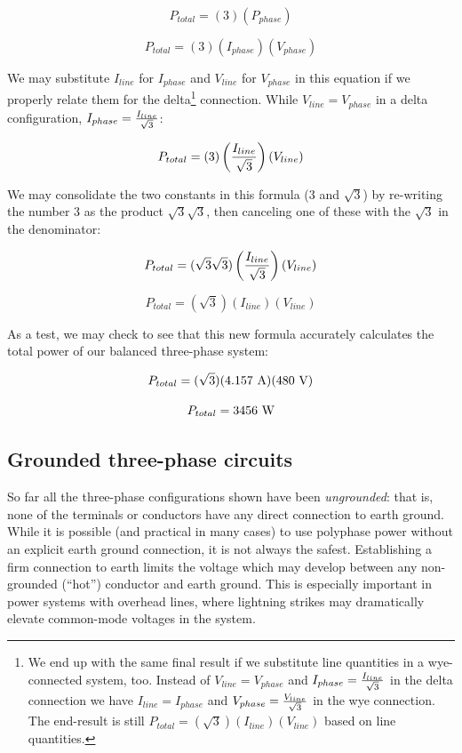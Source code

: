 $$P_{total} = (3) (P_{phase})$$

$$P_{total} = (3) (I_{phase})(V_{phase})$$

\filbreak

We may substitute $I_{line}$ for $I_{phase}$ and $V_{line}$ for $V_{phase}$ in this equation if we properly relate them for the delta\footnote{We end up with the same final result if we substitute line quantities in a wye-connected system, too.  Instead of $V_{line} = V_{phase}$ and $I_{phase} = {I_{line} \over \sqrt{3}}$ in the delta connection we have $I_{line} = I_{phase}$ and $V_{phase} = {V_{line} \over \sqrt{3}}$ in the wye connection.  The end-result is still $P_{total} = (\sqrt{3}) (I_{line})(V_{line})$ based on line quantities.} connection.  While $V_{line} = V_{phase}$ in a delta configuration, $I_{phase} = {I_{line} \over \sqrt{3}}$:

$$P_{total} = (3) \left({I_{line} \over \sqrt{3}}\right)(V_{line})$$

We may consolidate the two constants in this formula (3 and $\sqrt{3}$) by re-writing the number 3 as the product $\sqrt{3} \sqrt{3}$, then canceling one of these with the $\sqrt{3}$ in the denominator:

$$P_{total} = (\sqrt{3} \sqrt{3}) \left({I_{line} \over \sqrt{3}}\right)(V_{line})$$

$$P_{total} = (\sqrt{3}) (I_{line})(V_{line})$$

As a test, we may check to see that this new formula accurately calculates the total power of our balanced three-phase system:

$$P_{total} = (\sqrt{3}) (4.157 \hbox{ A})(480 \hbox{ V})$$

$$P_{total} = 3456 \hbox{ W}$$





\filbreak
\subsection{Grounded three-phase circuits}

So far all the three-phase configurations shown have been \textit{ungrounded}: that is, none of the terminals or conductors have any direct connection to earth ground.  While it is possible (and practical in many cases) to use polyphase power without an explicit earth ground connection, it is not always the safest.  Establishing a firm connection to earth limits the voltage which may develop between any non-grounded (``hot'') conductor and earth ground.  This is especially important in power systems with overhead lines, where lightning strikes may dramatically elevate common-mode voltages in the system.

